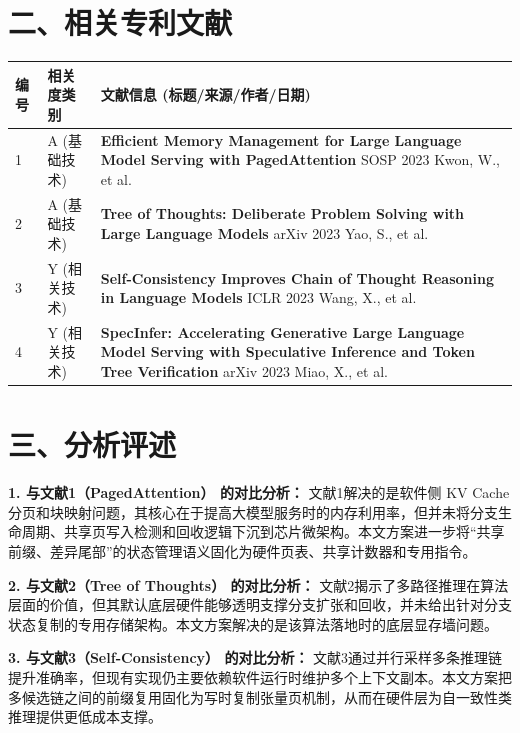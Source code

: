 \documentclass[12pt,a4paper]{article}
\begin{document}
\section*{二、相关专利文献}

\renewcommand{\arraystretch}{1.5}
\begin{longtable}{|p{1.5cm}|p{6cm}|p{7.5cm}|}
\hline
\textbf{编号} & \textbf{相关度类别} & \textbf{文献信息 (标题/来源/作者/日期)} \\
\hline
1 & A (基础技术) & \textbf{Efficient Memory Management for Large Language Model Serving with PagedAttention} \newline SOSP 2023 \newline Kwon, W., et al. \\
\hline
2 & A (基础技术) & \textbf{Tree of Thoughts: Deliberate Problem Solving with Large Language Models} \newline arXiv 2023 \newline Yao, S., et al. \\
\hline
3 & Y (相关技术) & \textbf{Self-Consistency Improves Chain of Thought Reasoning in Language Models} \newline ICLR 2023 \newline Wang, X., et al. \\
\hline
4 & Y (相关技术) & \textbf{SpecInfer: Accelerating Generative Large Language Model Serving with Speculative Inference and Token Tree Verification} \newline arXiv 2023 \newline Miao, X., et al. \\
\hline
\end{longtable}

\section*{三、分析评述}

\textbf{1. 与文献1（PagedAttention） 的对比分析：}
文献1解决的是软件侧 KV Cache 分页和块映射问题，其核心在于提高大模型服务时的内存利用率，但并未将分支生命周期、共享页写入检测和回收逻辑下沉到芯片微架构。本文方案进一步将“共享前缀、差异尾部”的状态管理语义固化为硬件页表、共享计数器和专用指令。

\textbf{2. 与文献2（Tree of Thoughts） 的对比分析：}
文献2揭示了多路径推理在算法层面的价值，但其默认底层硬件能够透明支撑分支扩张和回收，并未给出针对分支状态复制的专用存储架构。本文方案解决的是该算法落地时的底层显存墙问题。

\textbf{3. 与文献3（Self-Consistency） 的对比分析：}
文献3通过并行采样多条推理链提升准确率，但现有实现仍主要依赖软件运行时维护多个上下文副本。本文方案把多候选链之间的前缀复用固化为写时复制张量页机制，从而在硬件层为自一致性类推理提供更低成本支撑。
\end{document}
